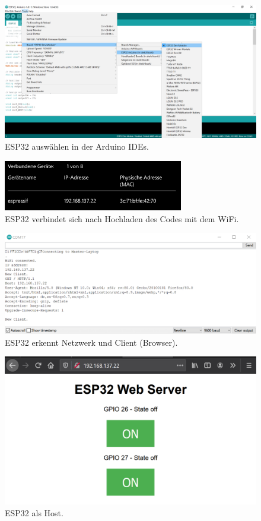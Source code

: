 \begin{figure}[H]
	\centering
	\includegraphics[width=\textwidth]{graphics/ESP32_Arduino_IDE}
	\caption{ESP32 auswählen in der Arduino IDEs.}
	\label{fig:ESP32_Arduino_IDE}
\end{figure}

\begin{figure}[H]
	\centering
	\includegraphics[width=0.7\textwidth]{graphics/ESP32_Verbundene_Geraete}
	\caption{ESP32 verbindet sich nach Hochladen des Codes mit dem WiFi.}
	\label{fig:ESP32_Verbundene_Geraete}
\end{figure}

\begin{figure}[H]
	\centering
	\includegraphics[width=\textwidth]{graphics/ESP32_Serial_Monitor}
	\caption{ESP32 erkennt Netzwerk und Client (Browser).}
	\label{fig:ESP32_Serial_Monitor}
\end{figure}

\begin{figure}[H]
	\centering
	\includegraphics[width=\textwidth]{graphics/ESP32_Webserver}
	\caption{ESP32 als Host.}
	\label{fig:ESP32_Webserver}
\end{figure}